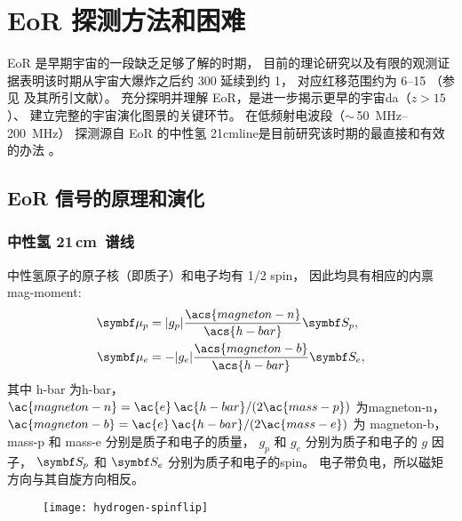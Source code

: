 

\chapter{EoR 探测方法和困难}
\label{chap:detection}


EoR 是早期宇宙的一段缺乏足够了解的时期，
目前的理论研究以及有限的观测证据表明该时期从宇宙大爆炸之后约 \SI{300}{\Myr}
延续到约 \SI{1}{\Gyr}，
对应红移范围约为 \numrange{6}{15}
（参见  及其所引文献）。
充分探明并理解 EoR，是进一步揭示更早的宇宙\ac{da}（$z > 15$）、
建立完整的宇宙演化图景的关键环节。
在低频射电波段（$\sim$\,\SIrange{50}{200}{\MHz}）
探测源自 EoR 的中性氢 \ac{21cmline}是目前研究该时期的最直接和有效的办法
\cite{madau1997,tozzi2000,furlanetto2006}。


\section{EoR 信号的原理和演化}
\label{sec:eor-signal}

\subsection{中性氢 21\texorpdfstring{\,}{ }cm~谱线}
\label{sec:21cm-line}

中性氢原子的原子核（即质子）和电子均有 1/2 \ac{spin}，
因此均具有相应的内禀\ac{mag-moment}:
\begin{align}
  \B{\mu}_p & = |g_p| \frac{\acs{magneton-n}}{\acs{h-bar}} \B{S}_p , \\
  \B{\mu}_e & = - |g_e| \frac{\acs{magneton-b}}{\acs{h-bar}} \B{S}_e ,
\end{align}
其中
\ac{h-bar} 为\acl{h-bar}，
$\ac{magneton-n} = \ac{e}\,\ac{h-bar} / (2 \ac{mass-p})$ 为\acl{magneton-n}，
$\ac{magneton-b} = \ac{e}\,\ac{h-bar} / (2 \ac{mass-e})$ 为 \acl{magneton-b}，
\ac{mass-p} 和 \ac{mass-e} 分别是质子和电子的质量，
$g_p$ 和 $g_e$ 分别为质子和电子的 $g$ 因子，
$\B{S}_p$ 和 $\B{S}_e$ 分别为质子和电子的\ac{spin}。
电子带负电，所以磁矩方向与其自旋方向相反。

\begin{figure}[htp]
  \centering
  \texttt{[image: hydrogen-spinflip]}
  \label{fig:hi-spinflip}
\end{figure}

